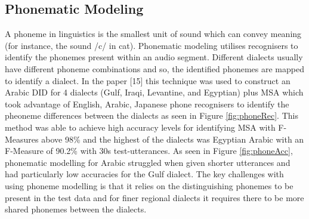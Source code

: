 \subsection{Phonematic Modeling}\label{sec:phonematic}
A phoneme in linguistics is the smallest unit of sound which can convey meaning (for instance, the sound /c/ in cat). 
Phonematic modeling utilises recognisers to identify the phonemes present within an audio segment. 
Different dialects usually have different phoneme combinations and so, the identified phonemes are mapped 
to identify a dialect. In the paper [15] this technique was used to construct an Arabic DID for 4 dialects (Gulf, Iraqi, Levantine, and Egyptian) plus MSA which took advantage of  
English, Arabic, Japanese phone recognisers to identify the pheoneme differences between the dialects as seen in Figure \ref{fig:phoneRec}. This method was able to achieve high accuracy 
levels for identifying MSA with F-Measures above 98\% and the highest of the dialects was Egyptian Arabic with an F-Measure of 90.2\% with 30s test-utterances. As seen in Figure \ref{fig:phoneAcc},  
phonematic modelling for Arabic struggled when given shorter utterances and had particularly low accuracies for the Gulf dialect. The key challenges with using phoneme modelling is that 
it relies on the distinguishing phonemes to be present in the test data and for finer regional dialects it requires there to be more shared phonemes between the dialects.

\begin{figure}[H]
\end{figure}
\pagebreak
